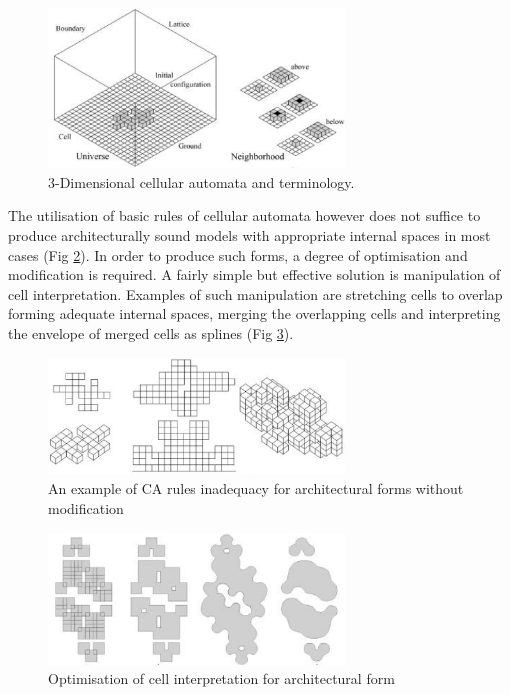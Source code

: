 \begin{figure}[htbp]
\centering
\includegraphics[width=0.7\textwidth]{./Images/2-3dCA}
\caption[3-Dimensional Cellular Automata]{3-Dimensional cellular automata and terminology.\cite{krawczyk02}}
\label{3dCA}
\end{figure}

The utilisation of basic rules of cellular automata however does not suffice to produce architecturally sound models with appropriate internal spaces in most cases (Fig \ref{3dCAArch}). In order to produce such forms, a degree of optimisation and modification is required. A fairly simple but effective solution is manipulation of cell interpretation. Examples of such manipulation are stretching cells to overlap forming adequate internal spaces, merging the overlapping cells and interpreting the envelope of merged cells as splines (Fig \ref{CA Optimisation}).

\begin{figure}[htbp]
\centering
\includegraphics[width=0.7\textwidth]{./Images/3-3dCAArch}
\caption[Cellular Automata Architectural Inadequacy]{An example of CA rules inadequacy for architectural forms without modification \cite{krawczyk02}}
\label{3dCAArch}
\end{figure}


\begin{figure}[htbp]
\centering
\includegraphics[width=0.7\textwidth]{./Images/4-3dCAArchOpt}
\caption[Cellular Automata Architectural Optimisation]{Optimisation of cell interpretation for architectural form \cite{krawczyk02}}
\label{CA Optimisation}
\end{figure}

